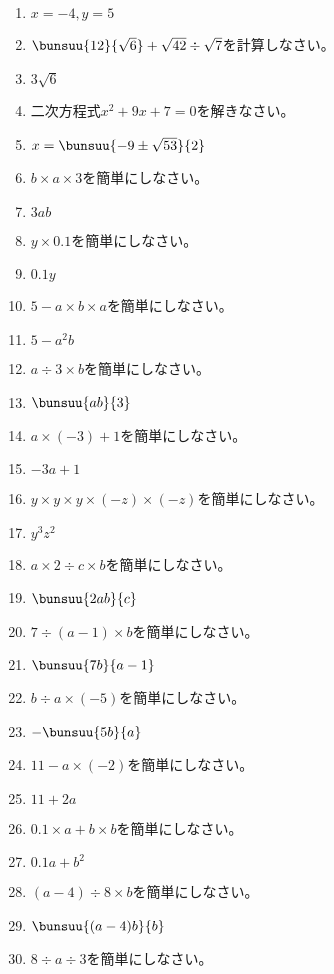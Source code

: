 \documentclass[uplatex,a4j,11pt]{jsreport}
\begin{document}
\begin{multicols}{2}
\begin{enumerate}
    \item $x=-4, y=5$
    \item $\bunsuu{12}{\sqrt{6}}+\sqrt{42}\div \sqrt{7}$\quad を計算しなさい。%
    \item $3\sqrt{6}$
    \item 二次方程式\quad$x^2+9x+7=0$\quad を解きなさい。%
    \item $x=\bunsuu{-9\pm\sqrt{53}}{2}$
    \item $b\times a\times 3$\quad を簡単にしなさい。%
    \item $3ab$
    \item $y\times 0.1$\quad を簡単にしなさい。%
    \item $0.1y$
    \item $5-a\times b\times a$\quad を簡単にしなさい。%
    \item $5-a^2b$
    \item $a\div 3\times b$\quad を簡単にしなさい。%
    \item $\bunsuu{ab}{3}$
    \item $a\times (-3)+1$\quad を簡単にしなさい。%
    \item $-3a+1$
    \item $y\times y\times y\times (-z)\times (-z)$\quad を簡単にしなさい。%
    \item $y^3z^2$
    \item $a\times 2\div c\times b$\quad を簡単にしなさい。%
    \item $\bunsuu{2ab}{c}$
    \item $7\div (a-1)\times b$\quad を簡単にしなさい。%
    \item $\bunsuu{7b}{a-1}$
    \item $b\div a\times (-5)$\quad を簡単にしなさい。%
    \item $-\bunsuu{5b}{a}$
    \item $11-a\times (-2)$\quad を簡単にしなさい。%
    \item $11+2a$
    \item $0.1\times a+b\times b$\quad を簡単にしなさい。%
    \item $0.1a+b^2$
    \item $(a-4)\div 8\times b$\quad を簡単にしなさい。%
    \item $\bunsuu{(a-4)b}{b}$
    \item $8\div a\div 3$\quad を簡単にしなさい。%

\end{enumerate}
\end{multicols}
\end{document}
